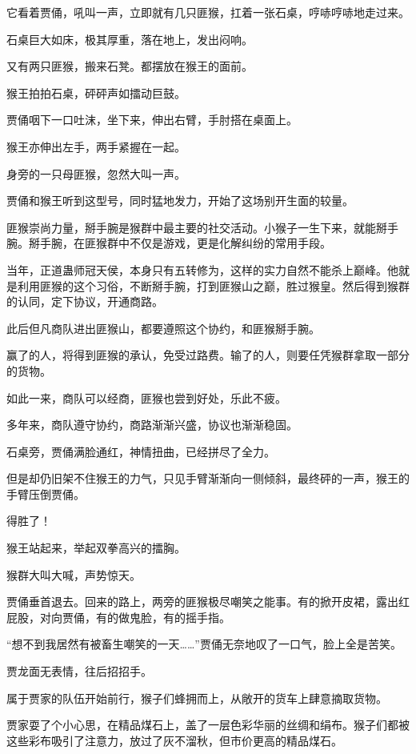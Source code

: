 \begin{this_body}
它看着贾俑，吼叫一声，立即就有几只匪猴，扛着一张石桌，哼哧哼哧地走过来。

石桌巨大如床，极其厚重，落在地上，发出闷响。

又有两只匪猴，搬来石凳。都摆放在猴王的面前。

猴王拍拍石桌，砰砰声如擂动巨鼓。

贾俑咽下一口吐沫，坐下来，伸出右臂，手肘搭在桌面上。

猴王亦伸出左手，两手紧握在一起。

身旁的一只母匪猴，忽然大叫一声。

贾俑和猴王听到这型号，同时猛地发力，开始了这场别开生面的较量。

匪猴崇尚力量，掰手腕是猴群中最主要的社交活动。小猴子一生下来，就能掰手腕。掰手腕，在匪猴群中不仅是游戏，更是化解纠纷的常用手段。

当年，正道蛊师冠天侯，本身只有五转修为，这样的实力自然不能杀上巅峰。他就是利用匪猴的这个习俗，不断掰手腕，打到匪猴山之巅，胜过猴皇。然后得到猴群的认同，定下协议，开通商路。

此后但凡商队进出匪猴山，都要遵照这个协约，和匪猴掰手腕。

赢了的人，将得到匪猴的承认，免受过路费。输了的人，则要任凭猴群拿取一部分的货物。

如此一来，商队可以经商，匪猴也尝到好处，乐此不疲。

多年来，商队遵守协约，商路渐渐兴盛，协议也渐渐稳固。

石桌旁，贾俑满脸通红，神情扭曲，已经拼尽了全力。

但是却仍旧架不住猴王的力气，只见手臂渐渐向一侧倾斜，最终砰的一声，猴王的手臂压倒贾俑。

得胜了！

猴王站起来，举起双拳高兴的擂胸。

猴群大叫大喊，声势惊天。

贾俑垂首退去。回来的路上，两旁的匪猴极尽嘲笑之能事。有的掀开皮裙，露出红屁股，对向贾俑，有的做鬼脸，有的摇手指。

“想不到我居然有被畜生嘲笑的一天……”贾俑无奈地叹了一口气，脸上全是苦笑。

贾龙面无表情，往后招招手。

属于贾家的队伍开始前行，猴子们蜂拥而上，从敞开的货车上肆意摘取货物。

贾家耍了个小心思，在精品煤石上，盖了一层色彩华丽的丝绸和绢布。猴子们都被这些彩布吸引了注意力，放过了灰不溜秋，但市价更高的精品煤石。


\end{this_body}
